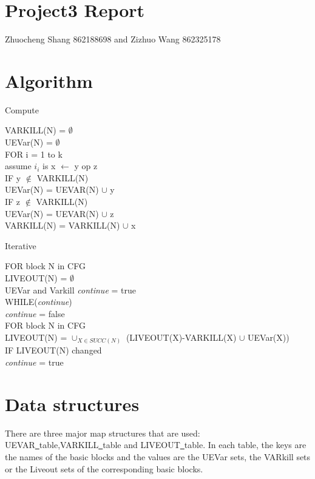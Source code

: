 \documentclass{article}[12pt]
\begin{document}
{\centering\section*{Project3 Report}}
\begin{center}
	Zhuocheng Shang 862188698 and Zizhuo Wang 862325178
\end{center}
\section{Algorithm}
\begin{algorithm}[H]
	\caption{Compute }\label{algo:algo}
	VARKILL(N) = $\emptyset$ \\
	UEVar(N) = $\emptyset$ \\
	FOR i = 1 to k \\
	\qquad assume $i_{i}$ is x $\leftarrow$ y op z\\
	\qquad IF y $\notin $ VARKILL(N) \\
	\qquad\qquad UEVar(N) = UEVAR(N) $\cup $ y\\
\qquad 	IF z $\notin $ VARKILL(N)\\
	\qquad\qquad UEVar(N) = UEVAR(N) $\cup $ z\\
	\qquad VARKILL(N) = VARKILL(N) $\cup $ x\\
\end{algorithm}

\begin{algorithm}[H]
	\caption{Iterative}
	FOR block N in CFG \\
	\qquad LIVEOUT(N) = $\emptyset$\\UEVar and Varkill
	\qquad \textit{continue} = true\\
	WHILE(\textit{continue})\\
	\qquad \textit{continue} = false\\
	\qquad FOR block N in CFG\\
	\qquad \qquad LIVEOUT(N) = $ \cup_{X \in SUCC(N)}$  (LIVEOUT(X)-VARKILL(X) $\cup$ UEVar(X))\\
	\qquad \qquad IF LIVEOUT(N) changed\\
	\qquad\qquad\qquad \textit{continue} = true
\end{algorithm}
\section{Data structures}

There are three major map structures that are used:  UEVAR\underline{~}table,VARKILL\underline{~}table and  LIVEOUT\underline{~}table. In each table, the keys are the names of the basic blocks and the values are the UEVar sets, the VARkill sets or the Liveout sets of the corresponding basic blocks.
\end{document}
